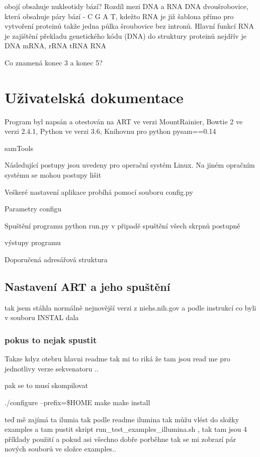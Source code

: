 \documentclass[czech,DP]{thesiskiv}
\numberwithin{equation}{section}
\begin{document}
obojí obsahuje nukleotidy bází? 
Rozdíl mezi DNA a RNA
DNA dvoušrobovice, která obsahuje páry bází - C G A T, kdežto RNA je již šablona přímo pro vytvoření proteinů takže jedna půlka šroubovice bez intronů. 
Hlavní funkcí RNA je zajištění překladu genetického kódu (DNA) do struktury proteinů
nejdřív je DNA  mRNA, rRNA tRNA RNA

Co znamená konec 3 a konec 5? 

% 
%
\nocite{*}

{\raggedright\small

}


\appendix
\chapter{Uživatelská dokumentace}
Program byl napsán a otestován na ART ve verzi MountRainier, Bowtie 2 ve verzi 2.4.1, Python ve verzi 3.6, Knihovnu pro python pysam==0.14 
 
 samTools

Následující postupy jsou uvedeny pro operační  systém Linux. Na jiném opračním systému se mohou postupy lišit

Veškeré nastavení aplikace probíhá pomocí souboru config.py

Parametry configu

Spuštění programu
python run.py v připadě spuštění všech skrpnů postupně

výstupy programu

Doporučená adresářová struktura
\section{Nastavení ART a jeho spuštění}
tak jsem stáhla normálně nejnovější verzi z niehs.nih.gov a podle instrukcí co byli v souboru INSTAL dala %

\subsection{pokus to nejak spustit}
Takze kdyz otebru hlavni readme tak mi to riká že tam jsou read me pro jednotlivy verze sekvenatoru ..

pak se to musí skompilovat 

./configure --prefix=\$HOME
	       	make
	       	make install	 
	 
teď mě zajímá ta ilumia tak podle readme ilumina tak můžu vlést do složky examples a tam pustit skript run\_test\_examples\_illumina.sh , tak tam jsou 4 příklady použití 
a pokud asi všechno dobře porběhne tak se mi zobrazí pár nových souborů ve složce examples.. 
\end{document}
